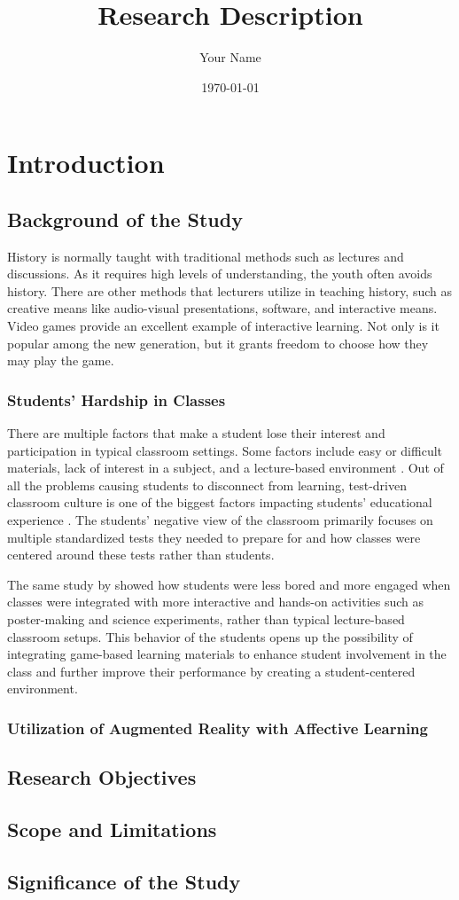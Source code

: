 \documentclass{article}
\title{Research Description}
\author{Your Name}
\date{\today}
\begin{document}
\maketitle

\chapter{Introduction}
\label{sec:intro}

\section{Background of the Study}
\label{sec:overview}

History is normally taught with traditional methods such as lectures and discussions. As it requires high levels of understanding, the youth often avoids history. There are other methods that lecturers utilize in teaching history, such as creative means like audio-visual presentations, software, and interactive means. Video games provide an excellent example of interactive learning. Not only is it popular among the new generation, but it grants freedom to choose how they may play the game.

\subsection{Students' Hardship in Classes}
There are multiple factors that make a student lose their interest and participation in typical classroom settings. Some factors include easy or difficult materials, lack of interest in a subject, and a lecture-based environment \cite{medium:mosley}. Out of all the problems causing students to disconnect from learning, test-driven classroom culture is one of the biggest factors impacting students' educational experience \cite{mora}. The students’ negative view of the classroom primarily focuses on multiple standardized tests they needed to prepare for and how classes were centered around these tests rather than students.

The same study by \cite{mora} showed how students were less bored and more engaged when classes were integrated with more interactive and hands-on activities such as poster-making and science experiments, rather than typical lecture-based classroom setups. This behavior of the students opens up the possibility of integrating game-based learning materials to enhance student involvement in the class and further improve their performance by creating a student-centered environment.

\subsection{Utilization of Augmented Reality with Affective Learning}

\section{Research Objectives}

\section{Scope and Limitations}

\section{Significance of the Study}
\end{document}
